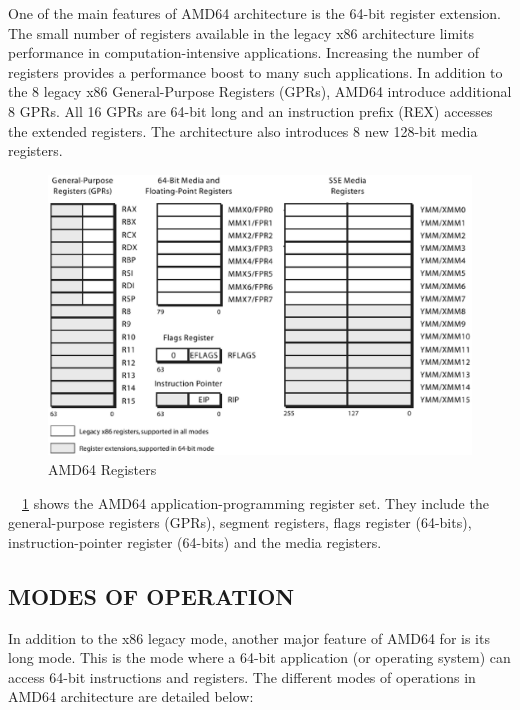 One of the main features of AMD64 architecture is the 64-bit register extension. The small number of registers available in the legacy x86 architecture limits performance in computation-intensive applications. Increasing the number of registers provides a performance boost to many such applications. In addition to the 8 legacy x86 General-Purpose Registers (GPRs), AMD64 introduce additional 8 GPRs. All 16 GPRs are 64-bit long and an instruction prefix (REX) accesses the extended registers. The architecture also introduces 8 new 128-bit media registers.
\begin{figure}[h!]
\centering
\includegraphics[width=6in]{./figures/registers.eps}
\caption{AMD64 Registers}
\label{fig:registers.eps}
\end{figure}


~\figurename{~\ref{fig:registers.eps}} shows the AMD64 application-programming register set. They include the general-purpose registers (GPRs), segment registers, flags register (64-bits), instruction-pointer register (64-bits) and the media registers. 

\subsection{MODES OF OPERATION}
In addition to the x86 legacy mode, another major feature of AMD64 for is its long mode. This is the mode where a 64-bit application (or operating system) can access 64-bit instructions and registers.%
The different modes of operations in AMD64 architecture are detailed below:

